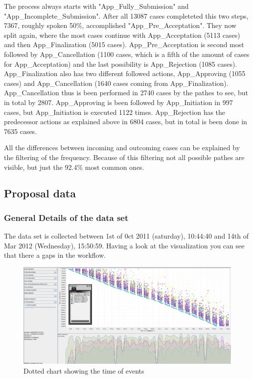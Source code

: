 The process always starts with "App\_Fully\_Submission" and "App\_Incomplete\_Submission". After all 13087 cases completeted this two steps, 7367, roughly spoken 50\%, accomplished "App\_Pre\_Acceptation". They now split again, where the most cases continue with App\_Acceptation (5113 cases) and then App\_Finalization (5015 cases). App\_Pre\_Acceptation is second most followed by App\_Cancellation (1100 cases, which is a fifth of the amount of cases for App\_Acceptation) and the last possibility is App\_Rejection (1085 cases). App\_Finalization also has two different followed actions, App\_Approving (1055 cases) and App\_Cancellation (1640 cases coming from App\_Finalization). App\_Cancellation thus is been performed in 2740 cases by the pathes to see, but in total by 2807. App\_Approving is been followed by App\_Initiation in 997 cases, but App\_Initiation is executed 1122 times. App\_Rejection has the predecessor actions as explained above in 6804 cases, but in total is been done in 7635 cases. 

All the differences between incoming and outcoming cases can be explained by the filtering of the frequency. Because of this filtering not all possible pathes are visible, but just the 92.4\% most common ones.

\subsection{Proposal data}

\subsubsection{General Details of the data set}
The data set is collected between 1st of 0ct 2011 (saturday), 10:44:40 and 14th of Mar 2012 (Wednesday), 15:50:59. Having a look at the visualization you can see that there a gaps in the workflow. 

\begin{figure}[!htbp]
\centering
\includegraphics[height = 0.2\textheight]{ProposalData.PNG}
\caption{Dotted chart showing the time of events}
\label{fig:PropTimeFlow}
\end{figure}

